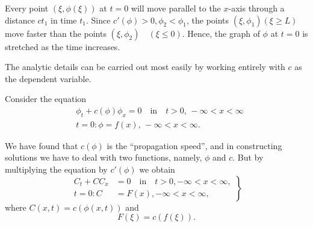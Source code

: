 Every point $(\xi,\phi(\xi))$ at $t=0$ will move parallel to the
$x$-axis through a distance $ct_1$ in time $t_1$. Since
$c'(\phi)>0,\phi_2<\phi_1$, the points $(\xi,\phi_1)(\xi\geq L)$
move faster than the points $(\xi,\phi_2)\quad(\xi\leq 0)$. Hence, the
graph of $\phi$ at $t=0$ is stretched as the time increases. 

The analytic details can be carried out most easily by working
entirely with $c$ as the dependent variable. 
\medskip


Consider the equation
\begin{align*}
&\phi_t+c(\phi)\phi_x=0\quad\text{in}\quad t>0,\, -\infty < x < \infty\\
& t=0: \phi=f(x), \, -\infty < x < \infty.
\end{align*}

We have found that $c(\phi)$ is the ``propagation speed'', and in constructing solutions we have to deal with two functions, namely, $\phi$ and $c$. But by multiplying the equation by $c'(\phi)$ we obtain
\begin{equation}
\left.
\begin{aligned}
C_t+CC_x &= 0\quad\text{in}\quad t>0, -\infty < x < \infty,\\
t=0: C&= F(x), -\infty < x < \infty,
\end{aligned}
\right\}\tag{1.15}\label{chap1:eq1.15}
\end{equation}\pageoriginale
where $C(x,t)=c(\phi(x,t))$ and
$$
F(\xi)=c(f(\xi)).
$$

